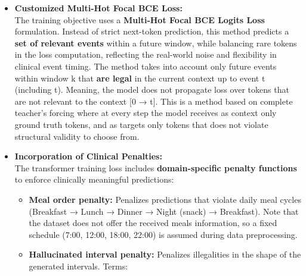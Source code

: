 \documentclass[
]{article}
\begin{document}
\begin{itemize}
\begin{itemize}
    \begin{itemize}
    \item
      The \textbf{next-token prediction head} uses weight tying with the
      event embedding layer, maintaining parameter efficiency.
    \item
      An additional \textbf{Δt prediction head} is trained to predict
      the timing of the next event (Δt), allowing explicit modeling of
      temporal intervals alongside event predictions.
    \end{itemize}
  \item
    \textbf{Customized Multi-Hot Focal BCE Loss:\\
    } The training objective uses a \textbf{Multi-Hot Focal BCE Logits
    Loss} formulation. Instead of strict next-token prediction, this
    method predicts a \textbf{set of relevant events} within a future
    window, while balancing rare tokens in the loss computation,
    reflecting the real-world noise and flexibility in clinical event
    timing. The method takes into account only future events within
    window k that \textbf{are legal} in the current context up to event
    t (including t). Meaning, the model does not propagate loss over
    tokens that are not relevant to the context {[}0 → t{]}. This is a
    method based on complete teacher's forcing where at every step the
    model receives as context only ground truth tokens, and as targets
    only tokens that does not violate structural validity to choose
    from.
  \item
    \textbf{Incorporation of Clinical Penalties:\\
    } The transformer training loss includes \textbf{domain-specific
    penalty functions} to enforce clinically meaningful predictions:

    \begin{itemize}
    \item
      \textbf{Meal order penalty:} Penalizes predictions that violate
      daily meal cycles (Breakfast → Lunch → Dinner → Night (snack) →
      Breakfast). Note that the dataset does not offer the received
      meals information, so a fixed schedule (7:00, 12:00, 18:00, 22:00)
      is assumed during data preprocessing.
    \item
      \textbf{Hallucinated interval penalty:} Penalizes illegalities in
      the shape of the generated intervals. Terms:
    \end{itemize}
  \end{itemize}
\end{itemize}
\end{document}
